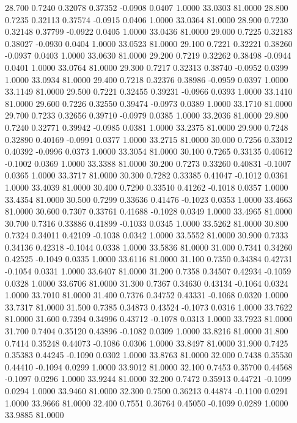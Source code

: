   28.700   0.7240   0.32078   0.37352  -0.0908   0.0407   1.0000  33.0303  81.0000
  28.800   0.7235   0.32113   0.37574  -0.0915   0.0406   1.0000  33.0364  81.0000
  28.900   0.7230   0.32148   0.37799  -0.0922   0.0405   1.0000  33.0436  81.0000
  29.000   0.7225   0.32183   0.38027  -0.0930   0.0404   1.0000  33.0523  81.0000
  29.100   0.7221   0.32221   0.38260  -0.0937   0.0403   1.0000  33.0630  81.0000
  29.200   0.7219   0.32262   0.38498  -0.0944   0.0401   1.0000  33.0764  81.0000
  29.300   0.7217   0.32313   0.38740  -0.0952   0.0399   1.0000  33.0934  81.0000
  29.400   0.7218   0.32376   0.38986  -0.0959   0.0397   1.0000  33.1149  81.0000
  29.500   0.7221   0.32455   0.39231  -0.0966   0.0393   1.0000  33.1410  81.0000
  29.600   0.7226   0.32550   0.39474  -0.0973   0.0389   1.0000  33.1710  81.0000
  29.700   0.7233   0.32656   0.39710  -0.0979   0.0385   1.0000  33.2036  81.0000
  29.800   0.7240   0.32771   0.39942  -0.0985   0.0381   1.0000  33.2375  81.0000
  29.900   0.7248   0.32890   0.40169  -0.0991   0.0377   1.0000  33.2715  81.0000
  30.000   0.7256   0.33012   0.40392  -0.0996   0.0373   1.0000  33.3054  81.0000
  30.100   0.7265   0.33135   0.40612  -0.1002   0.0369   1.0000  33.3388  81.0000
  30.200   0.7273   0.33260   0.40831  -0.1007   0.0365   1.0000  33.3717  81.0000
  30.300   0.7282   0.33385   0.41047  -0.1012   0.0361   1.0000  33.4039  81.0000
  30.400   0.7290   0.33510   0.41262  -0.1018   0.0357   1.0000  33.4354  81.0000
  30.500   0.7299   0.33636   0.41476  -0.1023   0.0353   1.0000  33.4663  81.0000
  30.600   0.7307   0.33761   0.41688  -0.1028   0.0349   1.0000  33.4965  81.0000
  30.700   0.7316   0.33886   0.41899  -0.1033   0.0345   1.0000  33.5262  81.0000
  30.800   0.7324   0.34011   0.42109  -0.1038   0.0342   1.0000  33.5552  81.0000
  30.900   0.7333   0.34136   0.42318  -0.1044   0.0338   1.0000  33.5836  81.0000
  31.000   0.7341   0.34260   0.42525  -0.1049   0.0335   1.0000  33.6116  81.0000
  31.100   0.7350   0.34384   0.42731  -0.1054   0.0331   1.0000  33.6407  81.0000
  31.200   0.7358   0.34507   0.42934  -0.1059   0.0328   1.0000  33.6706  81.0000
  31.300   0.7367   0.34630   0.43134  -0.1064   0.0324   1.0000  33.7010  81.0000
  31.400   0.7376   0.34752   0.43331  -0.1068   0.0320   1.0000  33.7317  81.0000
  31.500   0.7385   0.34873   0.43524  -0.1073   0.0316   1.0000  33.7622  81.0000
  31.600   0.7394   0.34996   0.43712  -0.1078   0.0313   1.0000  33.7923  81.0000
  31.700   0.7404   0.35120   0.43896  -0.1082   0.0309   1.0000  33.8216  81.0000
  31.800   0.7414   0.35248   0.44073  -0.1086   0.0306   1.0000  33.8497  81.0000
  31.900   0.7425   0.35383   0.44245  -0.1090   0.0302   1.0000  33.8763  81.0000
  32.000   0.7438   0.35530   0.44410  -0.1094   0.0299   1.0000  33.9012  81.0000
  32.100   0.7453   0.35700   0.44568  -0.1097   0.0296   1.0000  33.9244  81.0000
  32.200   0.7472   0.35913   0.44721  -0.1099   0.0294   1.0000  33.9460  81.0000
  32.300   0.7500   0.36213   0.44874  -0.1100   0.0291   1.0000  33.9666  81.0000
  32.400   0.7551   0.36764   0.45050  -0.1099   0.0289   1.0000  33.9885  81.0000
